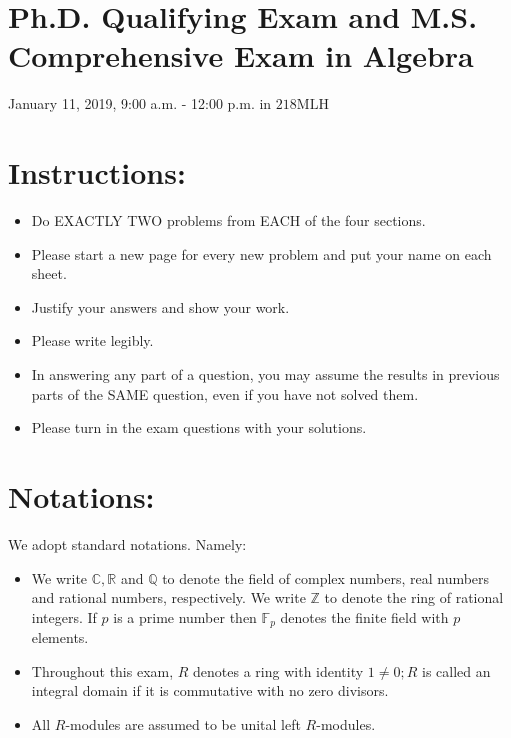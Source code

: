 \documentclass[10pt]{article}
\begin{document}
\section*{Ph.D. Qualifying Exam and M.S. Comprehensive Exam in Algebra }

January 11, 2019, 9:00 a.m. - 12:00 p.m. in $218 \mathrm{MLH}$

\section*{Instructions: }
\begin{itemize}
  \item Do EXACTLY TWO problems from EACH of the four sections.

  \item Please start a new page for every new problem and put your name on each sheet.

  \item Justify your answers and show your work.

  \item Please write legibly.

  \item In answering any part of a question, you may assume the results in previous parts of the SAME question, even if you have not solved them.

  \item Please turn in the exam questions with your solutions.

\end{itemize}
\section{Notations:}
We adopt standard notations. Namely:

\begin{itemize}
  \item We write $\mathbb{C}, \mathbb{R}$ and $\mathbb{Q}$ to denote the field of complex numbers, real numbers and rational numbers, respectively. We write $\mathbb{Z}$ to denote the ring of rational integers. If $p$ is a prime number then $\mathbb{F}_{p}$ denotes the finite field with $p$ elements.

  \item Throughout this exam, $R$ denotes a ring with identity $1 \neq 0 ; R$ is called an integral domain if it is commutative with no zero divisors.

  \item All $R$-modules are assumed to be unital left $R$-modules.

\end{itemize}
\end{document}
